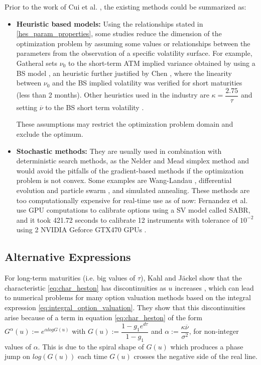 \documentclass[12,twoside]{mammeTFM}
\theoremstyle{definition}
\theoremstyle{remark}
\newcommand{\vega}{\nu}
\begin{document}
Prior to the work of Cui et al. \cite{cui17}, the existing methods could be summarized as:

\begin{itemize}
\item{\textbf{Heuristic based models:}}
Using the relationships stated in \ref{hes_param_properties}, some studies reduce the dimension of the optimization problem by assuming some values or relationships between the parameters from the observation of a specific volatility surface. For example, Gatheral sets $\nu_0$ to the short-term ATM implied variance obtained by using a BS model \cite{gat06}, an heuristic further justified by Chen \cite{che07}, where the linearity between $\nu_0$ and the BS implied volatility was verified for short maturities (less than 2 months). Other heuristics used in the industry are $\kappa = \dfrac{2.75}{\tau}$ and setting $\overline{\nu}$ to the BS short term volatility \cite{cla11}.

These assumptions may restrict the optimization problem domain and exclude the optimum.
\item{\textbf{Stochastic methods:}}
They are usually used in combination with deterministic search methods, as the Nelder and Mead simplex method \cite{lag98} and would avoid the pitfalls of the gradient-based methods if the optimization problem is not convex. Some examples are Wang-Landau \cite{che07}, differential evolution and particle swarm \cite{gil12_2}, and simulated annealing.
These methods are too computationally expensive for real-time use as of now: Fernandez et al. use GPU computations to calibrate options using a SV model called SABR, and it took 421.72 seconds to calibrate 12 instruments with tolerance of $10^{-2}$ using 2 NVIDIA Geforce GTX470 GPUs \cite{fer13}.


\end{itemize}

\subsection{Alternative Expressions}

For long-term maturities (i.e. big values of $\tau$), Kahl and J\"{a}ckel show that the characteristic  \ref{eq:char_heston} has discontinuities as $u$ increases \cite{kal06}, which can lead to numerical problems for many option valuation methods based on the integral expression \ref{eq:integral_option_valuation}. They show that this discontinuities arise because of a term in equation \ref{eq:char_heston} of the form $G^\alpha(u) := e^{\alpha log G(u)}$ with $G(u) := \dfrac{1 - g_1 e^{d\tau}}{1 - g_1}$ and $\alpha := \dfrac{\kappa \overline{\vega}}{\sigma^2}$, for non-integer values of $\alpha$. This is due to the spiral shape of $G(u)$ which produces a phase jump on $log(G(u))$ each time $G(u)$ crosses the negative side of the real line.
\end{document}
